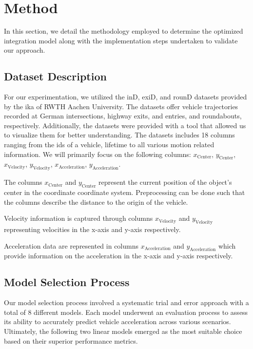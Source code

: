 \section{Method}

In this section, we detail the methodology employed to determine the optimized integration model
along with the implementation steps undertaken to validate our approach.

\subsection{Dataset Description} 
For our experimentation, we utilized the inD, exiD, and rounD datasets provided by the ika 
of RWTH Aachen University.
The datasets offer vehicle trajectories recorded at German intersections, highway exits, and entries, 
and roundabouts, respectively. 
Additionally, the datasets were provided with a tool that allowed us to visualize them for better understanding. 
The datasets includes 18 columns ranging from the ids of a vehicle, lifetime to all various motion related information.
We will primarily focus on the following columns:
$x_{\text{Center}}$, $y_{\text{Center}}$, $x_{\text{Velocity}}$, $y_{\text{Velocity}}$, $x_{\text{Acceleration}}$, 
$y_{\text{Acceleration}}$.

The columns  $x_{\text{Center}}$ and $y_{\text{Center}}$ represent the current position of the object's center in the coordinate coordinate system. Preprocessing can be done such that the columns describe the distance to the origin of the vehicle.

Velocity information is captured through columns $x_{\text{Velocity}}$ and $y_{\text{Velocity}}$ representing velocities 
in the x-axis and y-axis respectively.

Acceleration data are represented in columns $x_{\text{Acceleration}}$ and $y_{\text{Acceleration}}$ which provide 
information on the acceleration in the x-axis and y-axis respectively.

\subsection{Model Selection Process} 
Our model selection process involved a systematic trial and error approach with a total of 8 different models. 
Each model underwent an evaluation process to assess its ability to accurately predict vehicle acceleration across 
various scenarios. 
Ultimately, the following two linear models emerged as the most suitable choice based on their superior performance metrics.

